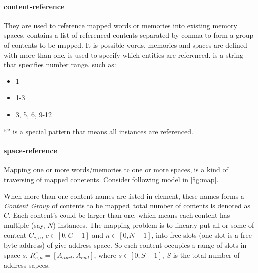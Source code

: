 \documentclass[10pt,oneside]{book}
\begin{document}
\paragraph{content-reference} 
They are used to reference mapped words or memories into existing memory
spaces.  contains a list of referenced contents separated 
by comma to form a group of contents to be mapped.
It is possible words, memories and spaces are defined with 
more than one.  is used to specify which entities are referenced. 
 is a string that specifies number range, such as:
\begin{itemize}
\item 1
\item 1-3
\item 3, 5, 6, 9-12
\end{itemize}
``\mhdl{*}'' is a special pattern that means all instances are referenced. 

\paragraph{space-reference}
Mapping one or more words/memories to one or more spaces, is a kind of traversing of
mapped conetents. Consider following model in \autoref{fig:map}. 

When more than one content names are listed in  
element, these names forms a \emph{Content Group} of contents to be mapped, total number 
of contents is denoted as $C$. Each content's  could be larger than one, 
which means each content has multiple (say, $N$) instances. The mapping problem is
to linearly put all or some of content $C_{c,n}$, $c \in [0, C-1]$ and $n \in [0,N-1]$, into 
free slots (one slot is a free byte address) of give address space. 
So each content occupies a range of slots  in space $s$, $R_{c,n}^s = [A_{start}, A_{end}]$, 
where $s \in [0,S-1]$, $S$ is the total number of address sapces. 
\end{document}

